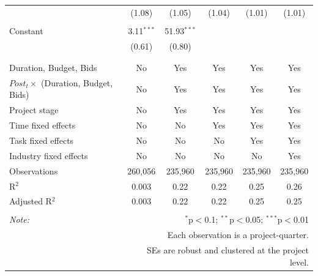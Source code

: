 \documentclass[
]{article}
\begin{document}
\begin{table}[H]
\begin{tabular}{@{\extracolsep{-2pt}}lccccc}
  & (1.08) & (1.05) & (1.04) & (1.01) & (1.01) \\ 
  & & & & & \\ 
 Constant & 3.11$^{***}$ & 51.93$^{***}$ &  &  &  \\ 
  & (0.61) & (0.80) &  &  &  \\ 
  & & & & & \\ 
\hline \\[-1.8ex] 
Duration, Budget, Bids & No & Yes & Yes & Yes & Yes \\ 
$Post_t \times $  (Duration, Budget, Bids) & No & Yes & Yes & Yes & Yes \\ 
Project stage & No & Yes & Yes & Yes & Yes \\ 
Time fixed effects & No & No & Yes & Yes & Yes \\ 
Task fixed effects & No & No & No & Yes & Yes \\ 
Industry fixed effects & No & No & No & No & Yes \\ 
Observations & 260,056 & 235,960 & 235,960 & 235,960 & 235,960 \\ 
R$^{2}$ & 0.003 & 0.22 & 0.22 & 0.25 & 0.26 \\ 
Adjusted R$^{2}$ & 0.003 & 0.22 & 0.22 & 0.25 & 0.25 \\ 
\hline 
\hline \\[-1.8ex] 
\textit{Note:}  & \multicolumn{5}{r}{$^{*}$p$<$0.1; $^{**}$p$<$0.05; $^{***}$p$<$0.01} \\ 
 & \multicolumn{5}{r}{Each observation is a project-quarter.} \\ 
 & \multicolumn{5}{r}{SEs are robust and clustered at the project level.} \\ 
\end{tabular} 
\end{table}
\end{document}
